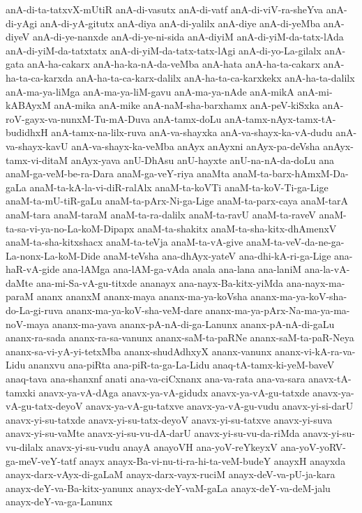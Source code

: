{anA-di-ta-tatxvX-mUtiR
anA-di-vasutx
anA-di-vatf
anA-di-viV-ra-sheYva
anA-di-yAgi
anA-di-yA-gitutx
anA-diya
anA-di-yalilx
anA-diye
anA-di-yeMba
anA-diyeV
anA-di-ye-nanxde
anA-di-ye-ni-sida
anA-diyiM
anA-di-yiM-da-tatx-lAda
anA-di-yiM-da-tatxtatx
anA-di-yiM-da-tatx-tatx-lAgi
anA-di-yo-La-gilalx
anA-gata
anA-ha-cakarx
anA-ha-ka-nA-da-veMba
anA-hata
anA-ha-ta-cakarx
anA-ha-ta-ca-karxda
anA-ha-ta-ca-karx-dalilx
anA-ha-ta-ca-karxkekx
anA-ha-ta-dalilx
anA-ma-ya-liMga
anA-ma-ya-liM-gavu
anA-ma-ya-nAde
anA-mikA
anA-mi-kABAyxM
anA-mika
anA-mike
anA-naM-sha-barxhamx
anA-peV-kiSxka
anA-roV-gayx-va-nunxM-Tu-mA-Duva
anA-tamx-doLu
anA-tamx-nAyx-tamx-tA-budidhxH
anA-tamx-na-lilx-ruva
anA-va-shayxka
anA-va-shayx-ka-vA-dudu
anA-va-shayx-kavU
anA-va-shayx-ka-veMba
anAyx
anAyxni
anAyx-pa-deVsha
anAyx-tamx-vi-ditaM
anAyx-yava
anU-DhAsu
anU-hayxte
anU-na-nA-da-doLu
ana
anaM-ga-veM-be-ra-Dara
anaM-ga-veY-riya
anaMta
anaM-ta-barx-hAmxM-Da-gaLa
anaM-ta-kA-la-vi-diR-ralAlx
anaM-ta-koVTi
anaM-ta-koV-Ti-ga-Lige
anaM-ta-mU-tiR-gaLu
anaM-ta-pArx-Ni-ga-Lige
anaM-ta-parx-caya
anaM-tarA
anaM-tara
anaM-taraM
anaM-ta-ra-dalilx
anaM-ta-ravU
anaM-ta-raveV
anaM-ta-sa-vi-ya-no-La-koM-Dipapx
anaM-ta-shakitx
anaM-ta-sha-kitx-dhAmenxV
anaM-ta-sha-kitxshacx
anaM-ta-teVja
anaM-ta-vA-give
anaM-ta-veV-da-ne-ga-La-nonx-La-koM-Dide
anaM-teVsha
ana-dhAyx-yateV
ana-dhi-kA-ri-ga-Lige
ana-haR-vA-gide
ana-lAMga
ana-lAM-ga-vAda
anala
ana-lana
ana-laniM
ana-la-vA-daMte
ana-mi-Sa-vA-gu-titxde
ananayx
ana-nayx-Ba-kitx-yiMda
ana-nayx-ma-paraM
ananx
ananxM
ananx-maya
ananx-ma-ya-koVsha
ananx-ma-ya-koV-sha-do-La-gi-ruva
ananx-ma-ya-koV-sha-veM-dare
ananx-ma-ya-pArx-Na-ma-ya-ma-noV-maya
ananx-ma-yava
ananx-pA-nA-di-ga-Lanunx
ananx-pA-nA-di-gaLu
ananx-ra-sada
ananx-ra-sa-vanunx
ananx-saM-ta-paRNe
ananx-saM-ta-paR-Neya
ananx-sa-vi-yA-yi-tetxMba
ananx-shudAdhxyX
ananx-vanunx
ananx-vi-kA-ra-va-Lidu
ananxvu
ana-piRta
ana-piR-ta-ga-La-Lidu
anaq-tA-tamx-ki-yeM-baveV
anaq-tava
ana-shanxnf
anati
ana-va-ciCxnanx
ana-va-rata
ana-va-sara
anavx-tA-tamxki
anavx-ya-vA-dAga
anavx-ya-vA-gidudx
anavx-ya-vA-gu-tatxde
anavx-ya-vA-gu-tatx-deyoV
anavx-ya-vA-gu-tatxve
anavx-ya-vA-gu-vudu
anavx-yi-si-darU
anavx-yi-su-tatxde
anavx-yi-su-tatx-deyoV
anavx-yi-su-tatxve
anavx-yi-suva
anavx-yi-su-vaMte
anavx-yi-su-vu-dA-darU
anavx-yi-su-vu-da-riMda
anavx-yi-su-vu-dilalx
anavx-yi-su-vudu
anayA
anayoVH
ana-yoV-reYkeyxV
ana-yoV-yoRV-ga-meV-veY-tatf
anayx
anayx-Ba-vi-nu-ti-ra-hi-ta-veM-budeY
anayxH
anayxda
anayx-darx-vAyx-di-gaLaM
anayx-darx-vayx-ruciM
anayx-deV-va-pU-ja-kara
anayx-deY-va-Ba-kitx-yanunx
anayx-deY-vaM-gaLa
anayx-deY-va-deM-jalu
anayx-deY-va-ga-Lanunx
}
